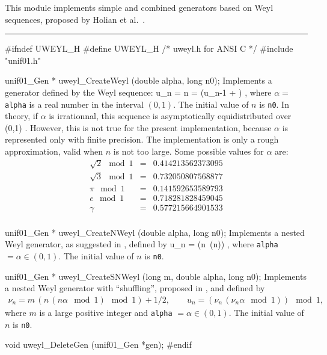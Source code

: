 
This module implements simple and combined generators based on 
Weyl sequences, proposed by Holian et al.\ \cite{rHOL94a}.


\bigskip
\hrule
\code
\hide
#ifndef UWEYL_H
#define UWEYL_H
/* uweyl.h for ANSI C */
\endhide
#include "unif01.h"


unif01_Gen * uweyl_CreateWeyl (double alpha, long n0);
\endcode
 \tab  Implements a  generator defined by the 
 Weyl sequence:
 \eq
   u_n = n \alpha {} = (u_{n-1} + \alpha) ,
 \endeq
 where $\alpha = $ {\tt alpha} is a  real number in the interval $(0,1)$.
 The  initial value of $n$ is {\tt n0}.
 In theory, if $\alpha$ is irrationnal, this sequence is asymptotically
 equidistributed over (0,1) \cite {rWEY16a}.
 However, this is not true for the present 
 implementation, because 
 $\alpha$ is represented only with finite precision.
 The implementation is only a rough approximation,
 valid when $n$ is not too large.
 Some possible values for $\alpha$ are:
 \begin {eqnarray*}
   \sqrt{2} \mod 1 &=&  0.414213562373095 \\
   \sqrt{3} \mod 1 &=&  0.732050807568877 \\
   \pi      \mod 1 &=&  0.141592653589793 \\
   e        \mod 1 &=&  0.718281828459045 \\
   \gamma          &=&  0.577215664901533 \\
 \end {eqnarray*}
 \endtab
\code

unif01_Gen * uweyl_CreateNWeyl (double alpha, long n0);
\endcode
 \tab  Implements a nested Weyl generator, as suggested in \cite{rHOL94a}, 
 defined by
 \eq
   u_n = (n\, (n\alpha {})) ,
 \endeq
 where {\tt alpha} $= \alpha \in (0,1)$. 
  The initial value of $n$ is {\tt n0}.
 \endtab
\code


unif01_Gen * uweyl_CreateSNWeyl (long m, double alpha, long n0);
\endcode
 \tab  Implements a nested Weyl generator with
 ``shuffling'', proposed in \cite{rHOL94a}, and defined by
 \begin {eqnarray*}
   \nu_n = m\, (n\, (n \alpha \mod 1) \mod 1) + 1/2,
       \qquad u_n   = (\nu_n\, (\nu_n \alpha \mod 1)) \mod 1,
 \end {eqnarray*}
 where $m$ is a large positive integer and  {\tt alpha} $=\alpha \in (0,1)$.
 The initial value of $n$ is {\tt n0}.
 \endtab



\code

void uweyl_DeleteGen (unif01_Gen *gen);
\endcode
 \tab \DelGen
 \endtab
\code
\hide
#endif
\endhide
\endcode
